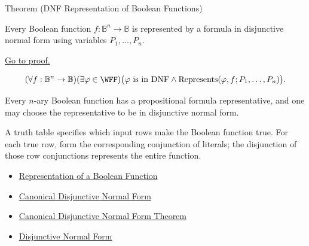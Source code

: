 \begin{theorembox}{Theorem (DNF Representation of Boolean Functions)}
\begin{theorem}
\label{thm:dnf-representation-of-boolean-functions-propositional-logic}
Every Boolean function \(f:\mathbb{B}^n\to\mathbb{B}\) is represented by a
formula in disjunctive normal form using variables \(P_1,\ldots,P_n\).

\noindent\hyperref[prf:dnf-representation-of-boolean-functions-propositional-logic]{Go to proof.}
\end{theorem}
\end{theorembox}

\begin{remark*}
\[
(\forall f:\mathbb{B}^n\to\mathbb{B})(\exists\varphi\in\WFF)
\bigl(\varphi\text{ is in DNF}\land
\operatorname{Represents}(\varphi,f;P_1,\ldots,P_n)\bigr).
\]
\end{remark*}

\begin{remark*}
Every \(n\)-ary Boolean function has a propositional formula representative, and
one may choose the representative to be in disjunctive normal form.
\end{remark*}

\begin{remark*}[Interpretation]
A truth table specifies which input rows make the Boolean function true. For
each true row, form the corresponding conjunction of literals; the disjunction
of those row conjunctions represents the entire function.
\end{remark*}

\begin{dependencies}
\begin{itemize}
  \item \hyperref[def:boolean-function-representation-propositional-logic]{Representation of a Boolean Function}
  \item \hyperref[def:canonical-disjunctive-normal-form-propositional-logic]{Canonical Disjunctive Normal Form}
  \item \hyperref[thm:canonical-disjunctive-normal-form-propositional-logic]{Canonical Disjunctive Normal Form Theorem}
  \item \hyperref[def:disjunctive-normal-form-propositional-logic]{Disjunctive Normal Form}
\end{itemize}
\end{dependencies}
